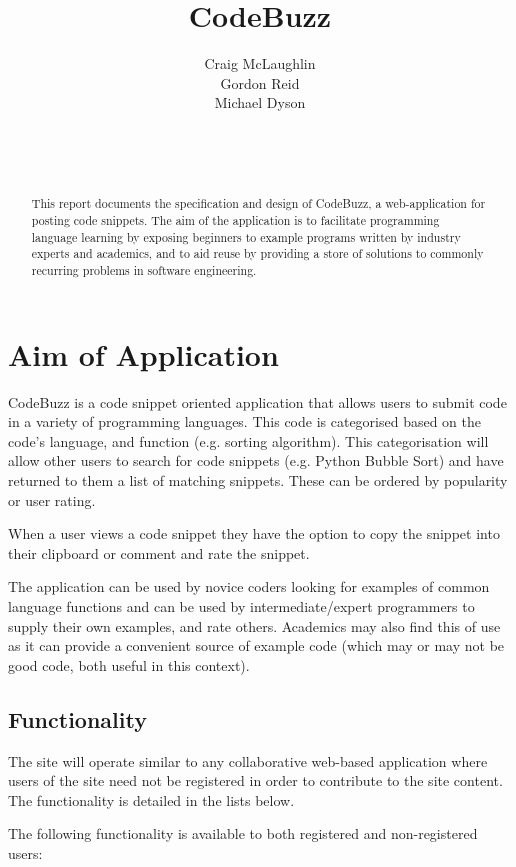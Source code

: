 \documentclass{sig-alt-release2}
\title{CodeBuzz}
\author{
\alignauthor
    Craig McLaughlin\\
    Gordon Reid\\
    Michael Dyson\\
	\affaddr{Team Gocky}\\
	\affaddr{DIM3}\\
	\affaddr{Student no.s}\\
    \email{\{1002524M,1002536R,1007389D\}@students.glasgow.ac.uk}
}
\begin{document}
\maketitle

\begin{abstract}

This report documents the specification and design of CodeBuzz,
a web-application for posting code snippets. The aim of the application is
to facilitate programming language learning by exposing beginners to
example programs written by industry experts and academics, and to
aid reuse by providing a store of solutions to commonly recurring
problems in software engineering. 
\end{abstract}

\section{Aim of Application}

CodeBuzz is a code snippet oriented application that allows users to submit code
in a variety of programming languages. This code is categorised based on the
code's language, and function (e.g. sorting algorithm). This categorisation
will allow other users to search for code snippets (e.g. Python Bubble Sort)
and have returned to them a list of matching snippets. These can be ordered
by popularity or user rating.

When a user views a code snippet they have the option to copy the snippet into
their clipboard or comment and rate the snippet.

The application can be used by novice coders looking for examples of common
language functions and can be used by intermediate/expert programmers to supply
their own examples, and rate others. Academics may also find this of use as
it can provide a convenient source of example code (which may or may not be
good code, both useful in this context).

\subsection{Functionality}

The site will operate similar to any collaborative web-based application
where users of the site need not be registered in order to contribute
to the site content. The functionality is detailed in the lists below.

The following functionality is available to both registered and
non-registered users:
\end{document}
